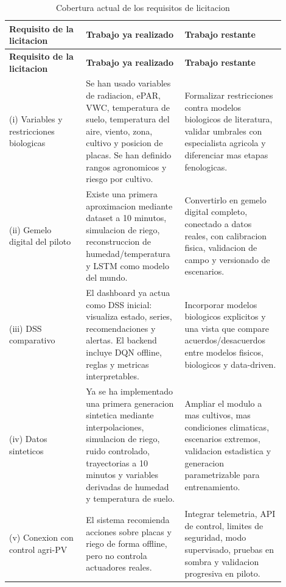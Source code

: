 ﻿\documentclass[11pt,a4paper]{article}
\begin{document}
\begin{longtable}{p{0.26\linewidth}p{0.30\linewidth}p{0.34\linewidth}}
\caption{Cobertura actual de los requisitos de licitacion}\\
\toprule
\textbf{Requisito de la licitacion} & \textbf{Trabajo ya realizado} & \textbf{Trabajo restante} \\
\midrule
\endfirsthead
\toprule
\textbf{Requisito de la licitacion} & \textbf{Trabajo ya realizado} & \textbf{Trabajo restante} \\
\midrule
\endhead
(i) Variables y restricciones biologicas & Se han usado variables de radiacion, ePAR, VWC, temperatura de suelo, temperatura del aire, viento, zona, cultivo y posicion de placas. Se han definido rangos agronomicos y riesgo por cultivo. & Formalizar restricciones contra modelos biologicos de literatura, validar umbrales con especialista agricola y diferenciar mas etapas fenologicas. \\ \addlinespace
(ii) Gemelo digital del piloto & Existe una primera aproximacion mediante dataset a 10 minutos, simulacion de riego, reconstruccion de humedad/temperatura y LSTM como modelo del mundo. & Convertirlo en gemelo digital completo, conectado a datos reales, con calibracion fisica, validacion de campo y versionado de escenarios. \\ \addlinespace
(iii) DSS comparativo & El dashboard ya actua como DSS inicial: visualiza estado, series, recomendaciones y alertas. El backend incluye DQN offline, reglas y metricas interpretables. & Incorporar modelos biologicos explicitos y una vista que compare acuerdos/desacuerdos entre modelos fisicos, biologicos y data-driven. \\ \addlinespace
(iv) Datos sinteticos & Ya se ha implementado una primera generacion sintetica mediante interpolaciones, simulacion de riego, ruido controlado, trayectorias a 10 minutos y variables derivadas de humedad y temperatura de suelo. & Ampliar el modulo a mas cultivos, mas condiciones climaticas, escenarios extremos, validacion estadistica y generacion parametrizable para entrenamiento. \\ \addlinespace
(v) Conexion con control agri-PV & El sistema recomienda acciones sobre placas y riego de forma offline, pero no controla actuadores reales. & Integrar telemetria, API de control, limites de seguridad, modo supervisado, pruebas en sombra y validacion progresiva en piloto. \\
\bottomrule
\end{longtable}
\end{document}
